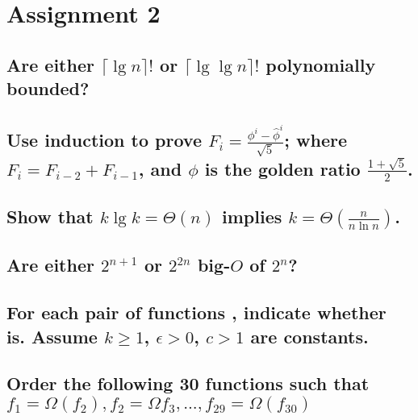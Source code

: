 \chapter{Assignment 2}

\section[Problem 1]{Are either $\lceil \lg n \rceil!$ or $\lceil \lg \lg n \rceil!$ polynomially bounded?}
\section[Problem 2]{Use induction to prove $F_i = \frac{\phi^i - \hat{\phi}^i}{\sqrt{5}}$; where $F_i = F_{i-2} + F_{i-1}$, and $\phi$ is the golden ratio $\frac{1 + \sqrt{5}}{2}$.}
\section[Problem 3]{Show that $k \lg k = \Theta(n)$ implies $k = \Theta\left(\frac{n}{n \ln n}\right)$.}
\section[Problem 4]{Are either $2^{n + 1}$ or $2^{2n}$ big-$O$ of $2^n$?}
\section[Problem 5]{For each pair of functions $ $, indicate whether $ $ is. Assume $k \geq 1$, $\epsilon > 0$, $c > 1$ are constants.}
\section[Problem 6]{Order the following 30 functions such that $f_1 = \Omega(f_2), f_2 = \Omega f_3, ..., f_{29} = \Omega(f_{30})$}
